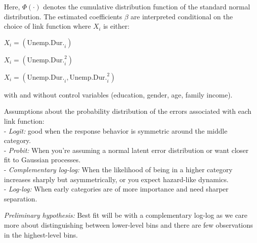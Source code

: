 Here, \(\Phi(\cdot)\) denotes the cumulative distribution function of
the standard normal distribution. The estimated coefficients \(\beta\)
are interpreted conditional on the choice of link function where \(X_i\)
is either:

\(X_i = \left( \text{Unemp.Dur.}_i \right)\)

\(X_i = \left( \text{Unemp.Dur.}_i^2 \right)\)

\(X_i = \left( \text{Unemp.Dur.}_i, \text{Unemp.Dur.}_i^2 \right)\)

with and without control variables (education, gender, age, family
income).

Assumptions about the probability distribution of the errors associated
with each link function:\\
- \emph{Logit:} good when the response behavior is symmetric around the
middle category.\\
- \emph{Probit:} When you're assuming a normal latent error distribution
or want closer fit to Gaussian processes.\\
- \emph{Complementary log-log:} When the likelihood of being in a higher
category increases sharply but asymmetrically, or you expect hazard-like
dynamics.\\
- \emph{Log-log:} When early categories are of more importance and need
sharper separation.

\emph{Preliminary hypothesis:} Best fit will be with a complementary
log-log as we care more about distinguishing between lower-level bins
and there are few observations in the highest-level bins.


